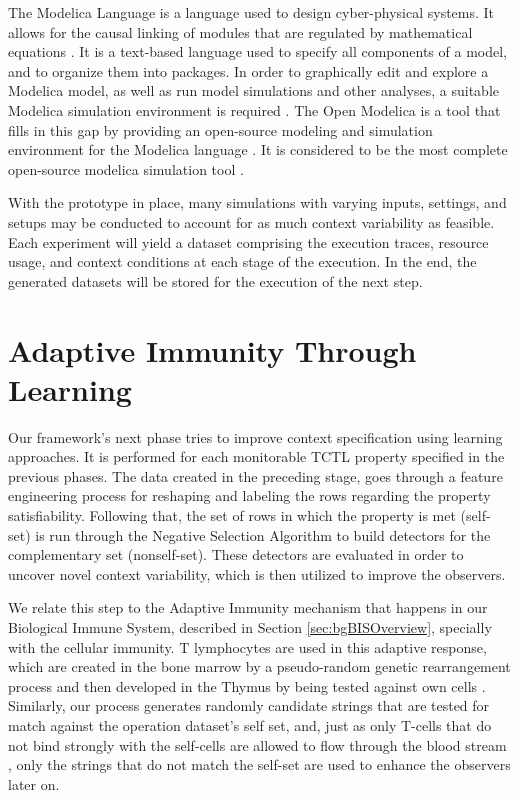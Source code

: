 The Modelica Language is a language used to design cyber-physical systems. It allows for the causal linking of modules that are regulated by mathematical equations \cite{Modelica}. It is a text-based language used to specify all components of a model, and to organize them into packages. In order to graphically edit and explore a Modelica model, as well as run model simulations and other analyses, a suitable Modelica simulation environment is required \cite{ModelicaSpecs}. The Open Modelica is a tool that fills in this gap by providing an open-source modeling and simulation environment for the Modelica language \cite{OpenModelica}. It is considered to be the most complete open-source modelica simulation tool \cite{OpenModelicaIM}.

With the prototype in place, many simulations with varying inputs, settings, and setups may be conducted to account for as much context variability as feasible. Each experiment will yield a dataset comprising the execution traces, resource usage, and context conditions at each stage of the execution. In the end, the generated datasets will be stored for the execution of the next step.


\section{Adaptive Immunity Through Learning}

Our framework's next phase tries to improve context specification using learning approaches. It is performed for each monitorable TCTL property specified in the previous phases. The data created in the preceding stage, goes through a feature engineering process for reshaping and labeling the rows regarding the property satisfiability. Following that, the set of rows in which the property is met (self-set) is run through the Negative Selection Algorithm to build detectors for the complementary set (nonself-set). These detectors are evaluated in order to uncover novel context variability, which is then utilized to improve the observers.


We relate this step to the Adaptive Immunity mechanism that happens in our Biological Immune System, described in Section \ref{sec:bgBISOverview}, specially with the cellular immunity. T lymphocytes are used in this adaptive response, which are created in the bone marrow by a pseudo-random genetic rearrangement process and then developed in the Thymus by being tested against own cells \cite{AIS2014}. Similarly, our process generates randomly candidate strings that are tested for match against the operation dataset's self set, and, just as only T-cells that do not bind strongly with the self-cells are allowed to flow through the blood stream \cite{Kuby2019}, only the strings that do not match the self-set are used to enhance the observers later on.

